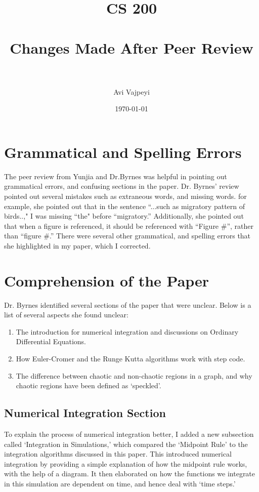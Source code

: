 \documentclass[paper=a4, fontsize=11pt]{scrartcl} %
\title{	
	\normalfont \normalsize 
	\textsc{CS 200} \\ [25pt] %
	\horrule{0.5pt} \\[0.4cm] %
	\huge Changes Made After Peer Review \\ %
	\horrule{2pt} \\[0.5cm] %
}
\author{Avi Vajpeyi} %
\date{\normalsize\today} %
\numberwithin{equation}{section} %
\numberwithin{figure}{section} %
\numberwithin{table}{section} %
\begin{document}
	
	\maketitle %
	
	
	\section{Grammatical and Spelling Errors}
	
	The peer review from Yunjia and Dr.Byrnes was helpful in pointing out grammatical errors, and confusing sections in the paper. Dr. Byrnes' review pointed out several mistakes such as extraneous words, and missing words. for example, she pointed out that in the sentence ``...such as migratory pattern of birds..," I was missing ``the" before ``migratory.'' Additionally, she pointed out that when a figure is referenced, it should be referenced with ``Figure \#'', rather than ``figure \#.'' There were several other grammatical, and spelling errors that she highlighted in my paper, which I corrected. 
	
	\section{Comprehension of the Paper}
	Dr. Byrnes identified several sections of the paper that were unclear. Below is a list of several aspects she found unclear:
	
	\begin{enumerate}
		\item The introduction for numerical integration and discussions on Ordinary Differential Equations.
		\item How Euler-Cromer and the Runge Kutta algorithms work with step code.
		\item The difference between chaotic and non-chaotic regions in a graph, and why chaotic regions have been defined as `speckled'.
		
	\end{enumerate}
	
	\subsection{Numerical Integration Section}
	To explain the process of numerical integration better, I added a new subsection called `Integration in Simulations,' which compared the `Midpoint Rule' to the integration algorithms discussed in this paper. This introduced numerical integration by providing a simple explanation of how the midpoint rule works, with the help of a diagram. It then elaborated on how the functions we integrate in this simulation are dependent on time, and hence deal with `time steps.'
	
\end{document}
